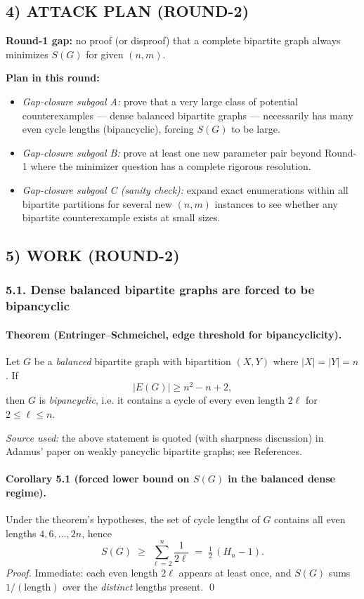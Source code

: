 \subsection*{4) \textbf{ATTACK PLAN (ROUND-2)}}
\textbf{Round-1 gap:} no proof (or disproof) that a complete bipartite graph always minimizes $S(G)$ for given $(n,m)$.

\textbf{Plan in this round:}
\begin{itemize}
\item \emph{Gap-closure subgoal A:} prove that a very large class of potential counterexamples --- dense balanced bipartite graphs --- necessarily has many even cycle lengths (bipancyclic), forcing $S(G)$ to be large.
\item \emph{Gap-closure subgoal B:} prove at least one new parameter pair beyond Round-1 where the minimizer question has a complete rigorous resolution.
\item \emph{Gap-closure subgoal C (sanity check):} expand exact enumerations within all bipartite partitions for several new $(n,m)$ instances to see whether any bipartite counterexample exists at small sizes.
\end{itemize}

\subsection*{5) \textbf{WORK (ROUND-2)}}

\subsubsection*{5.1. Dense balanced bipartite graphs are forced to be bipancyclic}

\paragraph{Theorem (Entringer--Schmeichel, edge threshold for bipancyclicity).}
Let $G$ be a \emph{balanced} bipartite graph with bipartition $(X,Y)$ where $|X|=|Y|=n$.
If
\[
|E(G)|\ge n^2-n+2,
\]
then $G$ is \emph{bipancyclic}, i.e. it contains a cycle of every even length $2\ell$ for $2\le \ell\le n$.

\emph{Source used:} the above statement is quoted (with sharpness discussion) in Adamus' paper on weakly pancyclic bipartite graphs; see References.

\paragraph{Corollary 5.1 (forced lower bound on $S(G)$ in the balanced dense regime).}
Under the theorem's hypotheses, the set of cycle lengths of $G$ contains all even lengths $4,6,\dots,2n$, hence
\[
S(G)\;\ge\;\sum_{\ell=2}^{n}\frac{1}{2\ell}
\;=\;\tfrac12\,(H_n-1).
\]
\emph{Proof.} Immediate: each even length $2\ell$ appears at least once, and $S(G)$ sums $1/(\text{length})$ over the \emph{distinct} lengths present. \qed

